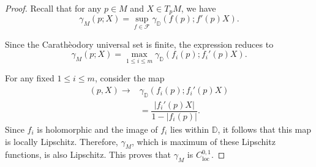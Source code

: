 \documentclass[10pt,a4paper]{amsart}
\begin{document}
\begin{proof}
	Recall that  for any $p\in M$ and $X\in T_pM$, we have 
	$$\gamma_M(p;X)=\sup_{f\in \mathcal{F}}\gamma_{\mathbb{D}}(f(p);f'(p)X).$$
	
	Since the Carath\`{e}odory universal set is finite, the expression reduces to 
		$$\gamma_M(p;X)=\max_{1\leq i\leq m}\gamma_{\mathbb{D}}(f_i(p);f_i'(p)X).$$
		
		For any fixed $1\leq i\leq m$,  consider the map 
		\begin{align*}(p,X)\to& \gamma_{\mathbb{D}}(f_i(p);f_i'(p)X)\\
			& =\dfrac{|f_i'(p)X|}{1-|f_i(p)|}.			
		\end{align*}
	Since $f_i$ is holomorphic and the image of $f_i$ lies within $\mathbb{D}$, it follows that 
	this map is locally Lipschitz. Therefore, $\gamma_M$, which is maximum of these Lipschitz 
	functions, is also Lipschitz. This proves that $\gamma_M$ is $C_{\text{loc}}^{0,1}$.
\end{proof}
\end{document}
